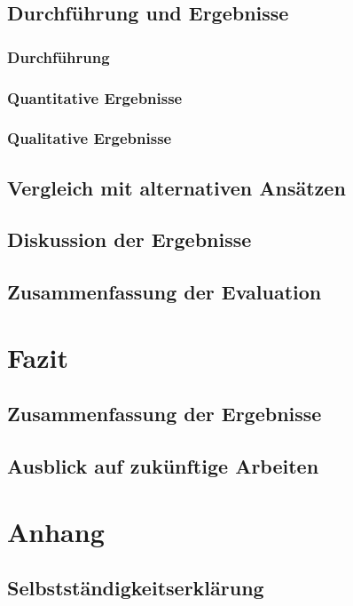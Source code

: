 \documentclass[a4paper,10pt,twoside]{report}
\begin{document}
\section{Durchführung und Ergebnisse}
\subsection{Durchführung}
\subsection{Quantitative Ergebnisse}
\subsection{Qualitative Ergebnisse}

\section{Vergleich mit alternativen Ansätzen}

\section{Diskussion der Ergebnisse}

\section{Zusammenfassung der Evaluation}

\chapter{Fazit}
\section{Zusammenfassung der Ergebnisse}
\section{Ausblick auf zukünftige Arbeiten}

\printbibliography[title={Literaturverzeichnis}]

\appendix
\chapter{Anhang}
\section*{Selbstständigkeitserklärung}
\end{document}
